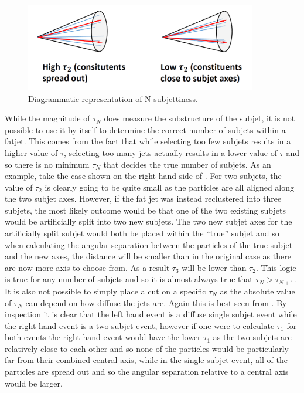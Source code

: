 \begin{figure}
  \centering
  \includegraphics[width=0.9\textwidth]{TopAnalysis/figures/nsubjettiness.png}
  \caption[Diagrammatic representation of N-subjettiness]{Diagrammatic representation of N-subjettiness.}
  \label{fig:nsubjet}
\end{figure}

While the magnitude of $\tau_N$ does measure the substructure of the subjet, it is not possible to use it by itself to determine the correct number of subjets within a fatjet. This comes from the fact that while selecting too few subjets results in a higher value of $\tau$, selecting too many jets actually results in a lower value of $\tau$ and so there is no minimum $\tau_N$ that decides the true number of subjets. As an example, take the case shown on the right hand side of . For two subjets, the value of $\tau_2$ is clearly going to be quite small as the particles are all aligned along the two subjet axes. However, if the fat jet was instead reclustered into three subjets, the most likely outcome would be that one of the two existing subjets would be artificially split into two new subjets. The two new subjet axes for the artificially split subjet would both be placed within the ``true'' subjet and so when calculating the angular separation between the particles of the true subjet and the new axes, the distance will be smaller than in the original case as there are now more axis to choose from. As a result $\tau_3$ will be lower than $\tau_2$. This logic is true for any number of subjets and so it is almost always true that $\tau_N > \tau_{N+1}$. It is also not possible to simply place a cut on a specific $\tau_N$ as the absolute value of $\tau_N$ can depend on how diffuse the jets are. Again this is best seen from . By inspection it is clear that the left hand event is a diffuse single subjet event while the right hand event is a two subjet event, however if one were to calculate $\tau_1$ for both events the right hand event would have the lower $\tau_1$ as the two subjets are relatively close to each other and so none of the particles would be particularly far from their combined central axis, while in the single subjet event, all of the particles are spread out and so the angular separation relative to a central axis would be larger.

